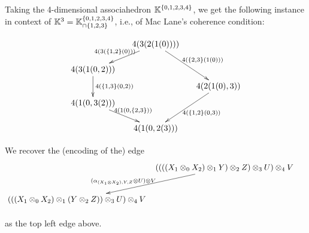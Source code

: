 \begin{example} 
  \label{Huet-MacLane}
Taking the 4-dimensional associahedron ${\mathbb K}^{\left\{0,1,2,3,4\right\}}$, we get the following instance in context of ${\mathbb K}^3={\mathbb K}^{\left\{0,1,2,3,4\right\}}_{\cap \left\{1,2,3\right\}}$, i.e., of Mac Lane's coherence condition:
\begin{center}
$$\xymatrix @-1.65pc {&& 4(3(2(1(0)))) \ar @{->}[ddll]_{4(3(\set{1,2}(0)))} \ar @{->}[dddrr]^{4(\set{2,3}(1(0)))}&& \\
 &&&&\\
4(3(1(0,2)))  \ar @{->}[dd]^{4(\set{1,3}(0,2))}&&   && \\
 &&&&4(2(1(0),3)) \ar @{->}[dddll]^{4(\set{1,2}(0,3))}\\
 4(1(0,3(2))) \ar @{->}[ddrr]^{4(1(0,\set{2,3}))} &  &\\
 &&&&\\
 &&4(1(0,2(3)))&&}$$
\end{center}
We recover the (encoding of the) edge 
 $$
 \xymatrix @-2pc {&& ((((X_1\otimes_0 X_2)\otimes_1 Y)\otimes_2 Z)\otimes_3 U)\otimes_4 V \ar @{->}[dddddll]_(.6){(\alpha_{(X_1\otimes X_2),Y,Z}\otimes U)\otimes V\quad} && \\
 &&&&\\
 &&&&\\
  &&&&\\
    &&&&\\
( ((X_1\otimes_0 X_2)\otimes_1 (Y\otimes_2 Z))\otimes_3 U)\otimes_4 V  &&   && \\
\ }
$$
as the top left edge above.
\end{example}

